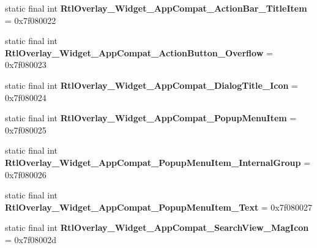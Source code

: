 \begin{DoxyCompactItemize}
\item 
\hypertarget{classandroid_1_1support_1_1design_1_1_r_1_1style_ae25aaafa59260a6b79ec287a3beb1a39}{}static final int {\bfseries Rtl\+Overlay\+\_\+\+Widget\+\_\+\+App\+Compat\+\_\+\+Action\+Bar\+\_\+\+Title\+Item} = 0x7f080022\label{classandroid_1_1support_1_1design_1_1_r_1_1style_ae25aaafa59260a6b79ec287a3beb1a39}

\item 
\hypertarget{classandroid_1_1support_1_1design_1_1_r_1_1style_adba3b1e5743251c556c29f53c9553d49}{}static final int {\bfseries Rtl\+Overlay\+\_\+\+Widget\+\_\+\+App\+Compat\+\_\+\+Action\+Button\+\_\+\+Overflow} = 0x7f080023\label{classandroid_1_1support_1_1design_1_1_r_1_1style_adba3b1e5743251c556c29f53c9553d49}

\item 
\hypertarget{classandroid_1_1support_1_1design_1_1_r_1_1style_a0246a2939405f0f3a9d2297f3a9af4af}{}static final int {\bfseries Rtl\+Overlay\+\_\+\+Widget\+\_\+\+App\+Compat\+\_\+\+Dialog\+Title\+\_\+\+Icon} = 0x7f080024\label{classandroid_1_1support_1_1design_1_1_r_1_1style_a0246a2939405f0f3a9d2297f3a9af4af}

\item 
\hypertarget{classandroid_1_1support_1_1design_1_1_r_1_1style_aa3c7b42ba6b7b9c67911c84bc40539c0}{}static final int {\bfseries Rtl\+Overlay\+\_\+\+Widget\+\_\+\+App\+Compat\+\_\+\+Popup\+Menu\+Item} = 0x7f080025\label{classandroid_1_1support_1_1design_1_1_r_1_1style_aa3c7b42ba6b7b9c67911c84bc40539c0}

\item 
\hypertarget{classandroid_1_1support_1_1design_1_1_r_1_1style_ad71265267679035bf7edd1e400e3dd35}{}static final int {\bfseries Rtl\+Overlay\+\_\+\+Widget\+\_\+\+App\+Compat\+\_\+\+Popup\+Menu\+Item\+\_\+\+Internal\+Group} = 0x7f080026\label{classandroid_1_1support_1_1design_1_1_r_1_1style_ad71265267679035bf7edd1e400e3dd35}

\item 
\hypertarget{classandroid_1_1support_1_1design_1_1_r_1_1style_ad1d99892921697cf4b200f1460ef494b}{}static final int {\bfseries Rtl\+Overlay\+\_\+\+Widget\+\_\+\+App\+Compat\+\_\+\+Popup\+Menu\+Item\+\_\+\+Text} = 0x7f080027\label{classandroid_1_1support_1_1design_1_1_r_1_1style_ad1d99892921697cf4b200f1460ef494b}

\item 
\hypertarget{classandroid_1_1support_1_1design_1_1_r_1_1style_ab4feb2c6d3b2235377bd63bfd6ccdbae}{}static final int {\bfseries Rtl\+Overlay\+\_\+\+Widget\+\_\+\+App\+Compat\+\_\+\+Search\+View\+\_\+\+Mag\+Icon} = 0x7f08002d\label{classandroid_1_1support_1_1design_1_1_r_1_1style_ab4feb2c6d3b2235377bd63bfd6ccdbae}


\end{DoxyCompactItemize}
